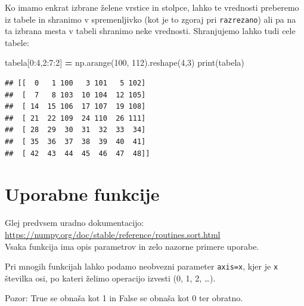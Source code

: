 \documentclass[
]{report}
\newenvironment{Shaded}{\begin{snugshade}}{\end{snugshade}}
\newcommand{\BuiltInTok}[1]{#1}
\newcommand{\DecValTok}[1]{\textcolor[rgb]{0.00,0.00,0.81}{#1}}
\newcommand{\NormalTok}[1]{#1}
\newcommand{\OperatorTok}[1]{\textcolor[rgb]{0.81,0.36,0.00}{\textbf{#1}}}
\begin{document}
Ko imamo enkrat izbrane želene vrstice in stolpce, lahko te vrednosti preberemo iz tabele in shranimo v spremenljivko (kot je to zgoraj pri \texttt{razrezano}) ali pa na ta izbrana mesta v tabeli shranimo neke vrednosti. Shranjujemo lahko tudi cele tabele:

\begin{Shaded}
\begin{Highlighting}[]
\NormalTok{tabela[}\DecValTok{0}\NormalTok{:}\DecValTok{4}\NormalTok{,}\DecValTok{2}\NormalTok{:}\DecValTok{7}\NormalTok{:}\DecValTok{2}\NormalTok{] }\OperatorTok{=}\NormalTok{ np.arange(}\DecValTok{100}\NormalTok{, }\DecValTok{112}\NormalTok{).reshape(}\DecValTok{4}\NormalTok{,}\DecValTok{3}\NormalTok{)}
\BuiltInTok{print}\NormalTok{(tabela)}
\end{Highlighting}
\end{Shaded}

\begin{verbatim}
## [[  0   1 100   3 101   5 102]
##  [  7   8 103  10 104  12 105]
##  [ 14  15 106  17 107  19 108]
##  [ 21  22 109  24 110  26 111]
##  [ 28  29  30  31  32  33  34]
##  [ 35  36  37  38  39  40  41]
##  [ 42  43  44  45  46  47  48]]
\end{verbatim}

\hypertarget{uporabne-funkcije}{%
\section{Uporabne funkcije}\label{uporabne-funkcije}}

Glej predvsem uradno dokumentacijo: \url{https://numpy.org/doc/stable/reference/routines.sort.html}\\
Vsaka funkcija ima opis parametrov in zelo nazorne primere uporabe.

Pri mnogih funkcijah lahko podamo neobvezni parameter \texttt{axis=x}, kjer je \texttt{x}
številka osi, po kateri želimo operacijo izvesti (0, 1, 2, \ldots).

Pozor: True se obnaša kot 1 in False se obnaša kot 0 ter obratno.
\end{document}
